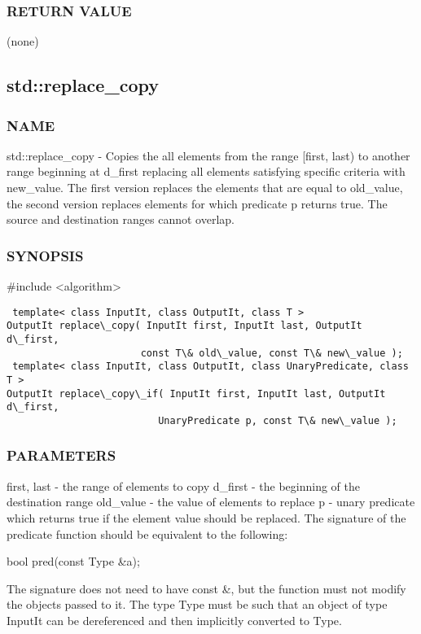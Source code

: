\subsubsection{RETURN VALUE}
(none)



\subsection{std::replace\_copy}

\subsubsection{NAME}
std::replace\_copy - Copies the all elements from the range [first, last) to another range beginning at d\_first replacing all elements satisfying specific criteria with new\_value. The first version replaces the elements that are equal to old\_value, the second version replaces elements for which predicate p returns true. The source and destination ranges cannot overlap.

\subsubsection{SYNOPSIS}
\#include <algorithm>

\begin{lstlisting}
 template< class InputIt, class OutputIt, class T >
OutputIt replace\_copy( InputIt first, InputIt last, OutputIt d\_first,
                       const T\& old\_value, const T\& new\_value );
 template< class InputIt, class OutputIt, class UnaryPredicate, class T >
OutputIt replace\_copy\_if( InputIt first, InputIt last, OutputIt d\_first,
                          UnaryPredicate p, const T\& new\_value );
\end{lstlisting}

\subsubsection{PARAMETERS}
first, last - the range of elements to copy
d\_first - the beginning of the destination range
old\_value - the value of elements to replace
p - unary predicate which returns true  if the element value should be replaced.
The signature of the predicate function should be equivalent to the following:

 bool pred(const Type \&a);

The signature does not need to have const \&, but the function must not modify the objects passed to it.
The type Type must be such that an object of type InputIt can be dereferenced and then implicitly converted to Type.

